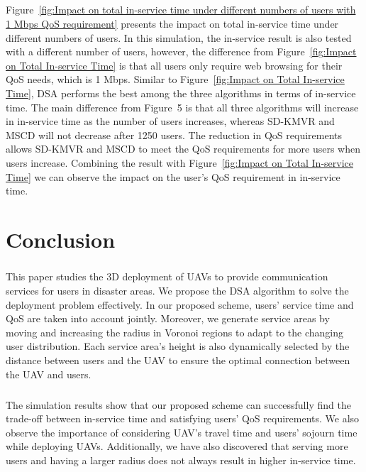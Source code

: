 \documentclass[a4paper,12pt]{report}
\begin{document}
\paragraph{}
Figure~\ref{fig:Impact on total in-service time under different numbers of users with 1 Mbps QoS requirement} presents the impact on total in-service time under different numbers of users. In this simulation, the in-service result is also tested with a different number of users, however, the difference from Figure~\ref{fig:Impact on Total In-service Time} is that all users only require web browsing for their QoS needs, which is 1 Mbps. Similar to Figure~\ref{fig:Impact on Total In-service Time}, DSA performs the best among the three algorithms in terms of in-service time. The main difference from Figure~5 is that all three algorithms will increase in in-service time as the number of users increases, whereas SD-KMVR and MSCD will not decrease after 1250 users. The reduction in QoS requirements allows SD-KMVR and MSCD to meet the QoS requirements for more users when users increase. Combining the result with Figure~\ref{fig:Impact on Total In-service Time} we can observe the impact on the user's QoS requirement in in-service time.

\chapter{Conclusion}
\paragraph{}
This paper studies the 3D deployment of UAVs to provide communication services for users in disaster areas. We propose the DSA algorithm to solve the deployment problem effectively. In our proposed scheme, users' service time and QoS are taken into account jointly. Moreover, we generate service areas by moving and increasing the radius in Voronoi regions to adapt to the changing user distribution. Each service area's height is also dynamically selected by the distance between users and the UAV to ensure the optimal connection between the UAV and users.
\paragraph{}
The simulation results show that our proposed scheme can successfully find the trade-off between in-service time and satisfying users' QoS requirements. We also observe the importance of considering UAV's travel time and users' sojourn time while deploying UAVs. Additionally, we have also discovered that serving more users and having a larger radius does not always result in higher in-service time.

\newpage
{}


\end{document}
